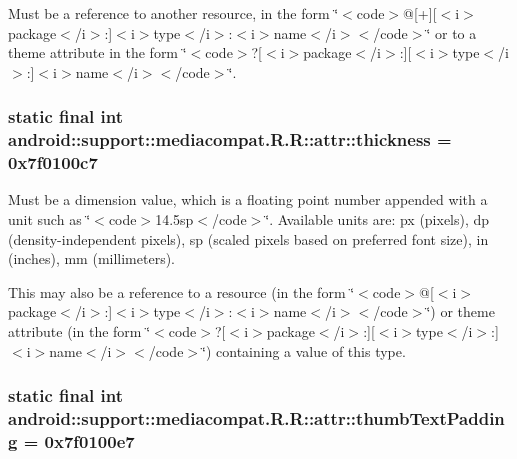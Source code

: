 Must be a reference to another resource, in the form \char`\"{}$<$code$>$@\mbox{[}+\mbox{]}\mbox{[}$<$i$>$package$<$/i$>$:\mbox{]}$<$i$>$type$<$/i$>$:$<$i$>$name$<$/i$>$$<$/code$>$\char`\"{} or to a theme attribute in the form \char`\"{}$<$code$>$?\mbox{[}$<$i$>$package$<$/i$>$:\mbox{]}\mbox{[}$<$i$>$type$<$/i$>$:\mbox{]}$<$i$>$name$<$/i$>$$<$/code$>$\char`\"{}. \hypertarget{classandroid_1_1support_1_1mediacompat_1_1_r_1_1attr_65e899a28d31d3815a7dbd48d85bcef6}{
\subsubsection[{thickness}]{\setlength{\rightskip}{0pt plus 5cm}static final int android::support::mediacompat.R.R::attr::thickness = 0x7f0100c7}}
\label{classandroid_1_1support_1_1mediacompat_1_1_r_1_1attr_65e899a28d31d3815a7dbd48d85bcef6}


Must be a dimension value, which is a floating point number appended with a unit such as \char`\"{}$<$code$>$14.5sp$<$/code$>$\char`\"{}. Available units are: px (pixels), dp (density-independent pixels), sp (scaled pixels based on preferred font size), in (inches), mm (millimeters). 

This may also be a reference to a resource (in the form \char`\"{}$<$code$>$@\mbox{[}$<$i$>$package$<$/i$>$:\mbox{]}$<$i$>$type$<$/i$>$:$<$i$>$name$<$/i$>$$<$/code$>$\char`\"{}) or theme attribute (in the form \char`\"{}$<$code$>$?\mbox{[}$<$i$>$package$<$/i$>$:\mbox{]}\mbox{[}$<$i$>$type$<$/i$>$:\mbox{]}$<$i$>$name$<$/i$>$$<$/code$>$\char`\"{}) containing a value of this type. \hypertarget{classandroid_1_1support_1_1mediacompat_1_1_r_1_1attr_3f834b6481e75e972aea2aaef3d1c709}{
\subsubsection[{thumbTextPadding}]{\setlength{\rightskip}{0pt plus 5cm}static final int android::support::mediacompat.R.R::attr::thumbTextPadding = 0x7f0100e7}}
\label{classandroid_1_1support_1_1mediacompat_1_1_r_1_1attr_3f834b6481e75e972aea2aaef3d1c709}


